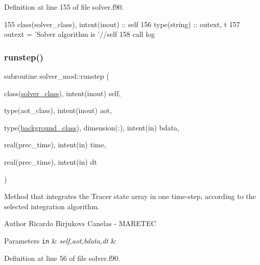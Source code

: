 Definition at line 155 of file solver.\+f90.


\begin{DoxyCode}
155     \textcolor{keywordtype}{class}(solver\_class), \textcolor{keywordtype}{intent(inout)} :: self
156     \textcolor{keywordtype}{type}(string) :: outext, t
157     outext = \textcolor{stringliteral}{'Solver algorithm is '}//self%
158     \textcolor{keyword}{call }log%
\end{DoxyCode}
\mbox{\label{namespacesolver__mod_ab87d71c6c8aa1709901ec14f9bf12505}} 
\subsubsection{\texorpdfstring{runstep()}{runstep()}}
{\footnotesize\ttfamily subroutine solver\+\_\+mod\+::runstep (\begin{DoxyParamCaption}\item[{class(\mbox{\hyperlink{structsolver__mod_1_1solver__class}{solver\+\_\+class}}), intent(inout)}]{self,  }\item[{type(aot\+\_\+class), intent(inout)}]{aot,  }\item[{type(\mbox{\hyperlink{structbackground__mod_1_1background__class}{background\+\_\+class}}), dimension(\+:), intent(in)}]{bdata,  }\item[{real(prec\+\_\+time), intent(in)}]{time,  }\item[{real(prec\+\_\+time), intent(in)}]{dt }\end{DoxyParamCaption})\hspace{0.3cm}{\ttfamily [private]}}



Method that integrates the Tracer state array in one time-\/step, according to the selected integration algorithm. 

\begin{DoxyAuthor}{Author}
Ricardo Birjukovs Canelas -\/ M\+A\+R\+E\+T\+EC 
\end{DoxyAuthor}

\begin{DoxyParams}[1]{Parameters}
\mbox{\tt in}  & {\em self,aot,bdata,dt} & \\
\hline
\end{DoxyParams}


Definition at line 56 of file solver.\+f90.


